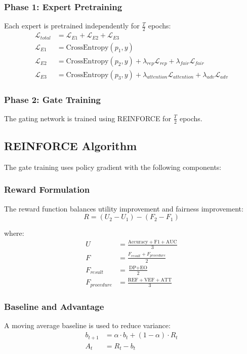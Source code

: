 \documentclass[11pt]{article}
\begin{document}
\subsubsection{Phase 1: Expert Pretraining}
Each expert is pretrained independently for $\frac{T}{2}$ epochs:
\begin{align}
    \mathcal{L}_{total} &= \mathcal{L}_{E1} + \mathcal{L}_{E2} + \mathcal{L}_{E3} \\
    \mathcal{L}_{E1} &= \text{CrossEntropy}(p_1, y) \\
    \mathcal{L}_{E2} &= \text{CrossEntropy}(p_2, y) + \lambda_{rep} \mathcal{L}_{rep} + \lambda_{fair} \mathcal{L}_{fair} \\
    \mathcal{L}_{E3} &= \text{CrossEntropy}(p_3, y) + \lambda_{attention} \mathcal{L}_{attention} + \lambda_{adv} \mathcal{L}_{adv}
\end{align}

\subsubsection{Phase 2: Gate Training}
The gating network is trained using REINFORCE for $\frac{T}{2}$ epochs.

\subsection{REINFORCE Algorithm}
The gate training uses policy gradient with the following components:

\subsubsection{Reward Formulation}
The reward function balances utility improvement and fairness improvement:
\begin{equation}
    R = (U_2 - U_1) - (F_2 - F_1)
\end{equation}

where:
\begin{align}
    U &= \frac{\text{Accuracy} + \text{F1} + \text{AUC}}{3} \\
    F &= \frac{F_{result} + F_{procedure}}{2} \\
    F_{result} &= \frac{\text{DP} + \text{EO}}{2} \\
    F_{procedure} &= \frac{\text{REF} + \text{VEF} + \text{ATT}}{3}
\end{align}

\subsubsection{Baseline and Advantage}
A moving average baseline is used to reduce variance:
\begin{align}
    b_{t+1} &= \alpha \cdot b_t + (1-\alpha) \cdot R_t \\
    A_t &= R_t - b_t
\end{align}
\end{document}
